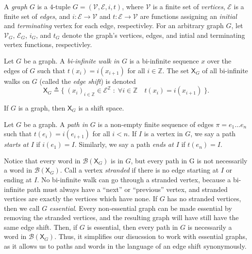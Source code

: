 \documentclass[hidelinks]{article}
\newcommand{\Vc}{\mathcal{V}}
\newcommand{\Ec}{\mathcal{E}}
\newcommand{\Bc}{\mathcal{B}}
\newcommand{\shift}[1]{\mathsf{X}_{#1}}
\newcommand{\term}[1]{\textit{#1}}
\theoremstyle{definition}
\begin{document}
\begin{definition}
    A \term{graph} \(G\) is a \(4\)-tuple \(G = (\Vc, \Ec, i, t)\), where \(\Vc\) is a finite 
    set of \term{vertices}, \(\Ec\) is a finite set of \term{edges}, and \(i : \Ec \to \Vc\) and 
    \(t : \Ec \to \Vc\) are functions assigning an \term{initial} and \term{terminating} vertex for 
    each edge, respectivley. For an arbitrary graph \(G\), let 
    \(\Vc_G\), \(\Ec_G\), \(i_G\), and \(t_G\) denote the graph's vertices, edges, and 
    intial and terminating vertex functions, respectivley. 
\end{definition}


\begin{definition}
    Let \(G\) be a graph. A \term{bi-infinite walk in \(G\)} is 
    a bi-infinite sequence \(x\) over the edges of \(G\) such that \(t(x_i) = i(x_{i+1})\)
    for all \(i \in \mathbb{Z}\).
    The set \(\shift{G}\) of all bi-infinite 
    walks on \(G\) (called the \term{edge shift}) is denoted
    \[\shift{G} \triangleq \big\{ \; (x_i)_{i \in \mathbb{Z}} \in \Ec^\mathbb{Z} \; : \; \forall i \in \mathbb{Z} \quad t(x_i) = i(x_{i+1}) \; \big\}. \]
\end{definition}

\begin{theorem}[name=\cite{lind1995introduction}]
    If \(G\) is a graph, then \(\shift{G}\) is a shift space.
\end{theorem}

Let \(G\) be a graph. A \term{path in \(G\)} is a non-empty finite sequence of edges \(\pi = e_1 \dots e_n\) such that \(t(e_i) = i(e_{i+1})\) for all \(i < n\).
If \(I\) is a vertex in \(G\), we say a path \term{starts at \(I\)} if \(i(e_1) = I\). Similarly, 
we say a path \term{ends at \(I\)} if \(t(e_n) = I\).

Notice that every word in \(\Bc(\shift{G})\) is in \(G\), but every path in G is 
not necessarily a word in \(\Bc(\shift{G})\). Call a vertex \term{stranded} if 
there is no edge starting at \(I\) or  ending at \(I\). No bi-infinite walk can go 
through a stranded vertex, because a bi-infinite path must always have a ``next''
or ``previous'' vertex, and stranded vertices are exactly the vertices which have none.
If \(G\) has no stranded vertices, then we call \(G\) \term{essential}. Every 
non-essential graph can be made essential by removing the stranded vertices, and 
the resulting graph will have still have the same edge shift. Then, if \(G\) 
is essential, then every path in \(G\) is necessarily a word in \(\Bc(\shift{G})\). 
Thus, it simplifies our disucssion to work with essential graphs, as 
it allows us to paths and words in the language of an edge shift synonymously. 
\end{document}
